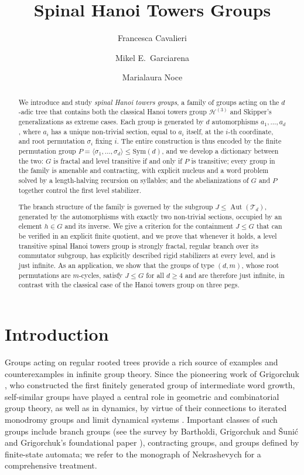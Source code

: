 \documentclass[11pt,leqno]{amsart}
\title[Spinal Hanoi Towers Groups]{Spinal Hanoi Towers Groups}
\author[F.~Cavalieri]{Francesca Cavalieri}
\author[M.\,E.~Garciarena]{Mikel E.\ Garciarena}
\author[M.~Noce]{Marialaura Noce}
\date{}
\theoremstyle{plain}
\newcommand\T{{\mathcal{T}}}
\DeclareMathOperator{\Aut}{Aut}
\numberwithin{equation}{section}
\begin{document}
\begin{abstract}
We introduce and study \emph{spinal Hanoi towers groups}, a family of groups acting on the $d$-adic tree that contains both the classical Hanoi towers group $\mathcal{H}^{(3)}$ and Skipper's generalizations as extreme cases. Each group is generated by $d$ automorphisms $a_1,\dots,a_d$, where $a_i$ has a unique non-trivial section, equal to $a_i$ itself, at the $i$-th coordinate, and root permutation $\sigma_i$ fixing $i$. The entire construction is thus encoded by the finite permutation group $P=\langle\sigma_1,\dots,\sigma_d\rangle\leq\mathrm{Sym}(d)$, and we develop a dictionary between the two: $G$ is fractal and level transitive if and only if $P$ is transitive; every group in the family is amenable and contracting, with explicit nucleus and a word problem solved by a length-halving recursion on syllables; and the abelianizations of $G$ and $P$ together control the first level stabilizer.

The branch structure of the family is governed by the subgroup $J\leq\Aut(\T_d)$, generated by the automorphisms with exactly two non-trivial sections, occupied by an element $h\in G$ and its inverse. We give a criterion for the containment $J\leq G$ that can be verified in an explicit finite quotient, and we prove that whenever it holds, a level transitive spinal Hanoi towers group is strongly fractal, regular branch over its commutator subgroup, has explicitly described rigid stabilizers at every level, and is just infinite. As an application, we show that the groups of type $(d,m)$, whose root permutations are $m$-cycles, satisfy $J\leq G$ for all $d\geq 4$ and are therefore just infinite, in contrast with the classical case of the Hanoi towers group on three pegs. 
\end{abstract}

\maketitle




\section{Introduction}

Groups acting on regular rooted trees provide a rich source of examples and counterexamples in infinite group theory. Since the pioneering work of Grigorchuk \cite{Grigorchuk84}, who constructed the first finitely generated group of intermediate word growth, self-similar groups have played a central role in geometric and combinatorial group theory, as well as in dynamics, by virtue of their connections to iterated monodromy groups and limit dynamical systems \cite{BartholdiNekrashevych08, ssg}. Important classes of such groups include branch groups (see the survey by Bartholdi, Grigorchuk and \v{S}uni\'c \cite{BGS03} and Grigorchuk's foundational paper \cite{JI grigorchuk}), contracting groups, and groups defined by finite-state automata; we refer to the monograph of Nekrashevych \cite{ssg} for a comprehensive treatment.
\end{document}
